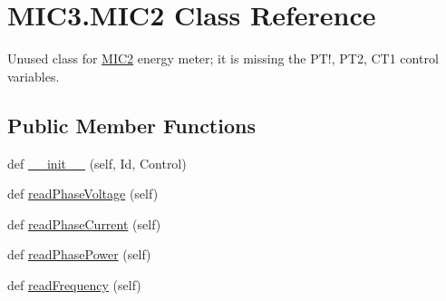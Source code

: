 \hypertarget{class_m_i_c3_1_1_m_i_c2}{}\section{M\+I\+C3.\+M\+I\+C2 Class Reference}
\label{class_m_i_c3_1_1_m_i_c2}


Unused class for \hyperlink{class_m_i_c3_1_1_m_i_c2}{M\+I\+C2} energy meter; it is missing the P\+T!, P\+T2, C\+T1 control variables.  


\subsection*{Public Member Functions}
\begin{DoxyCompactItemize}
\item 
def \hyperlink{class_m_i_c3_1_1_m_i_c2_a4db1a4c2894be1d777ab454027cade4a}{\+\_\+\+\_\+init\+\_\+\+\_\+} (self, Id, Control)
\item 
def \hyperlink{class_m_i_c3_1_1_m_i_c2_aa7db63e0fb9c6b1be36d0617c76707c0}{read\+Phase\+Voltage} (self)
\item 
def \hyperlink{class_m_i_c3_1_1_m_i_c2_a28cc6d8bef6e4861272cc9a3398d3833}{read\+Phase\+Current} (self)
\item 
def \hyperlink{class_m_i_c3_1_1_m_i_c2_a028b7ceca700f09e99db7f559224a914}{read\+Phase\+Power} (self)
\item 
def \hyperlink{class_m_i_c3_1_1_m_i_c2_acb035c98c0276bf264a1b33e05bae4dd}{read\+Frequency} (self)
\end{DoxyCompactItemize}

